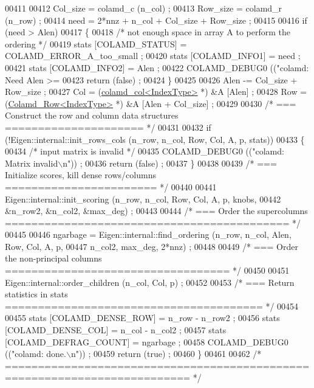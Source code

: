 \begin{DoxyCode}
{{{{{{00411   
00412   Col\_size = colamd\_c (n\_col) ;
00413   Row\_size = colamd\_r (n\_row) ;
00414   need = 2*nnz + n\_col + Col\_size + Row\_size ;
00415   
00416   \textcolor{keywordflow}{if} (need > Alen)
00417   \{
00418     \textcolor{comment}{/* not enough space in array A to perform the ordering */}
00419     stats [COLAMD\_STATUS] = COLAMD\_ERROR\_A\_too\_small ;
00420     stats [COLAMD\_INFO1] = need ;
00421     stats [COLAMD\_INFO2] = Alen ;
00422     COLAMD\_DEBUG0 ((\textcolor{stringliteral}{"colamd: Need Alen >= %
00423     \textcolor{keywordflow}{return} (\textcolor{keyword}{false}) ;
00424   \}
00425   
00426   Alen -= Col\_size + Row\_size ;
00427   Col = (\hyperlink{structinternal_1_1colamd__col}{colamd\_col<IndexType>} *) &A [Alen] ;
00428   Row = (\hyperlink{structinternal_1_1_colamd___row}{Colamd\_Row<IndexType>} *) &A [Alen + Col\_size] ;
00429 
00430   \textcolor{comment}{/* === Construct the row and column data structures ===================== */}
00431   
00432   \textcolor{keywordflow}{if} (!Eigen::internal::init\_rows\_cols (n\_row, n\_col, Row, Col, A, p, stats))
00433   \{
00434     \textcolor{comment}{/* input matrix is invalid */}
00435     COLAMD\_DEBUG0 ((\textcolor{stringliteral}{"colamd: Matrix invalid\(\backslash\)n"})) ;
00436     \textcolor{keywordflow}{return} (\textcolor{keyword}{false}) ;
00437   \}
00438   
00439   \textcolor{comment}{/* === Initialize scores, kill dense rows/columns ======================= */}
00440 
00441   Eigen::internal::init\_scoring (n\_row, n\_col, Row, Col, A, p, knobs,
00442         &n\_row2, &n\_col2, &max\_deg) ;
00443   
00444   \textcolor{comment}{/* === Order the supercolumns =========================================== */}
00445   
00446   ngarbage = Eigen::internal::find\_ordering (n\_row, n\_col, Alen, Row, Col, A, p,
00447                 n\_col2, max\_deg, 2*nnz) ;
00448   
00449   \textcolor{comment}{/* === Order the non-principal columns ================================== */}
00450   
00451   Eigen::internal::order\_children (n\_col, Col, p) ;
00452   
00453   \textcolor{comment}{/* === Return statistics in stats ======================================= */}
00454   
00455   stats [COLAMD\_DENSE\_ROW] = n\_row - n\_row2 ;
00456   stats [COLAMD\_DENSE\_COL] = n\_col - n\_col2 ;
00457   stats [COLAMD\_DEFRAG\_COUNT] = ngarbage ;
00458   COLAMD\_DEBUG0 ((\textcolor{stringliteral}{"colamd: done.\(\backslash\)n"})) ; 
00459   \textcolor{keywordflow}{return} (\textcolor{keyword}{true}) ;
00460 \}
00461 
00462 \textcolor{comment}{/* ========================================================================== */}
}}}}}}}
\end{DoxyCode}
